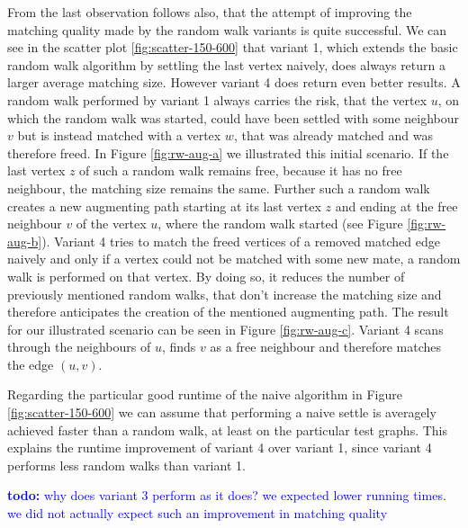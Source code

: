 \documentclass{article}      %
\newcommand\todo[1]{\textcolor{blue}{\textbf{todo: }#1}}
\begin{document}
From the last observation follows also, that the attempt of improving the matching quality made by the random walk variants is quite successful. We can see in the scatter plot \ref{fig:scatter-150-600} that variant 1, which extends the basic random walk algorithm by settling the last vertex naively, does always return a larger average matching size. However variant 4 does return even better results. A random walk performed by variant 1 always carries the risk, that the vertex $u$, on which the random walk was started, could have been settled with some neighbour $v$ but is instead matched with a vertex $w$, that was already matched and was therefore freed. In Figure \ref{fig:rw-aug-a} we illustrated this initial scenario. If the last vertex $z$ of such a random walk remains free, because it has no free neighbour, the matching size remains the same. Further such a random walk creates a new augmenting path starting at its last vertex $z$ and ending at the free neighbour $v$ of the vertex $u$, where the random walk started (see Figure \ref{fig:rw-aug-b}). Variant 4 tries to match the freed vertices of a removed matched edge naively and only if a vertex could not be matched with some new mate, a random walk is performed on that vertex. By doing so, it reduces the number of previously mentioned random walks, that don't increase the matching size and therefore anticipates the creation of the mentioned augmenting path. The result for our illustrated scenario can be seen in Figure \ref{fig:rw-aug-c}. Variant 4 scans through the neighbours of $u$, finds $v$ as a free neighbour and therefore matches the edge $(u,v)$. %

Regarding the particular good runtime of the naive algorithm in Figure \ref{fig:scatter-150-600} we can assume that performing a naive settle is averagely achieved faster than a random walk, at least on the particular test graphs. This explains the runtime improvement of variant 4 over variant 1, since variant 4 performs less random walks than variant 1. 

\todo{why does variant 3 perform as it does? we expected lower running times. we did not actually expect such an improvement in matching quality}
\end{document}
